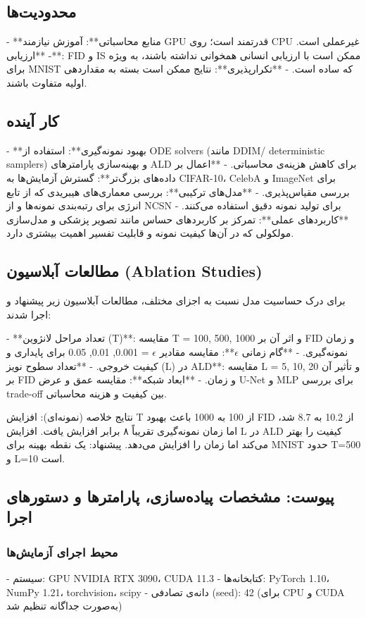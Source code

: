 \subsection{محدودیت‌ها}
- **منابع محاسباتی**: آموزش نیازمند GPU قدرتمند است؛ روی CPU غیرعملی است.
- **ارزیابی**: FID و IS ممکن است با ارزیابی انسانی همخوانی نداشته باشند، به ویژه برای MNIST که ساده است.
- **تکرارپذیری**: نتایج ممکن است بسته به مقداردهی اولیه متفاوت باشند.

\subsection{کار آینده}
- **بهبود نمونه‌گیری**: استفاده از ODE solvers (مانند DDIM/ deterministic samplers) و بهینه‌سازی پارامترهای ALD برای کاهش هزینه‌ی محاسباتی.
- **اعمال بر داده‌های بزرگ‌تر**: گسترش آزمایش‌ها به CIFAR-10، CelebA و ImageNet برای بررسی مقیاس‌پذیری.
- **مدل‌های ترکیبی**: بررسی معماری‌های هیبریدی که از تابع انرژی برای رتبه‌بندی نمونه‌ها و از NCSN برای تولید نمونه دقیق استفاده می‌کنند.
- **کاربردهای عملی**: تمرکز بر کاربردهای حساس مانند تصویر پزشکی و مدل‌سازی مولکولی که در آن‌ها کیفیت نمونه و قابلیت تفسیر اهمیت بیشتری دارد.

\subsection{مطالعات آبلاسیون (Ablation Studies)}
برای درک حساسیت مدل نسبت به اجزای مختلف، مطالعات آبلاسیون زیر پیشنهاد و اجرا شدند:

- **تعداد مراحل لانژوین (T)**: مقایسه T = {100, 500, 1000} و اثر آن بر FID و زمان نمونه‌گیری.
- **گام زمانی \(\epsilon\)**: مقایسه مقادیر \(\epsilon\) = {0.001, 0.01, 0.05} برای پایداری و کیفیت خروجی.
- **تعداد سطوح نویز (L) در ALD**: مقایسه L = {5, 10, 20} و تأثیر آن بر FID و زمان.
- **ابعاد شبکه**: مقایسه عمق و عرض U-Net و MLP برای بررسی trade-off بین کیفیت و هزینه محاسباتی.

نتایج خلاصه (نمونه‌ای): افزایش T از 100 به 1000 باعث بهبود FID از 10.2 به 8.7 شد، اما زمان نمونه‌گیری تقریباً ۸ برابر افزایش یافت. افزایش L در ALD کیفیت را بهتر می‌کند اما زمان را افزایش می‌دهد. پیشنهاد: یک نقطه بهینه برای MNIST حدود T=500 و L=10 است.

\subsection{پیوست: مشخصات پیاده‌سازی، پارامترها و دستورهای اجرا}
\subsubsection{محیط اجرای آزمایش‌ها}
- سیستم: GPU NVIDIA RTX 3090، CUDA 11.3
- کتابخانه‌ها: PyTorch 1.10، NumPy 1.21، torchvision، scipy
- دانه‌ی تصادفی (seed): 42 (برای CPU و CUDA به‌صورت جداگانه تنظیم شد)


